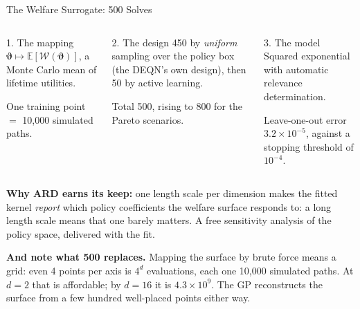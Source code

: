 \documentclass[aspectratio=169,11pt]{beamer}
\newcommand{\emphc}[1]{\textcolor{harvardcrimson}{#1}}
\newcommand{\E}[1]{\mathbb{E}\!\left[#1\right]}
\newcommand{\pol}{\bm{\vartheta}}       %
\begin{document}
\begin{frame}{The Welfare Surrogate: 500 Solves}
\small
\begin{columns}[T]
\begin{block}{1. The mapping}
$\pol \longmapsto \E{\mathcal{W}(\pol)}$, a Monte Carlo mean of lifetime utilities.

\vspace{2pt}
\emphc{One training point $=$ 10{,}000 simulated paths.}
\end{block}
\begin{block}{2. The design}
450 by \emph{uniform} sampling over the policy box (the DEQN's own design), then \emphc{50 by active learning}.

\vspace{2pt}
Total \emphc{500}, rising to 800 for the Pareto scenarios.
\end{block}
\begin{block}{3. The model}
Squared exponential with automatic relevance determination.

\vspace{2pt}
\emphc{Leave-one-out error $3.2\times10^{-5}$}, against a stopping threshold of $10^{-4}$.
\end{block}
\end{columns}

\vspace{0.3cm}
{\footnotesize \textbf{Why ARD earns its keep:} one length scale per dimension makes the fitted kernel \emph{report} which policy coefficients the welfare surface responds to: a long length scale means that one barely matters. A free sensitivity analysis of the policy space, delivered with the fit.

\vspace{3pt}
\textbf{And note what 500 replaces.} Mapping the surface by brute force means a grid: even 4 points per axis is $4^{d}$ evaluations, each one 10{,}000 simulated paths. At $d = 2$ that is affordable; by $d = 16$ it is $4.3 \times 10^{9}$. The GP reconstructs the surface from a few hundred well-placed points either way.}
\end{frame}
\end{document}
